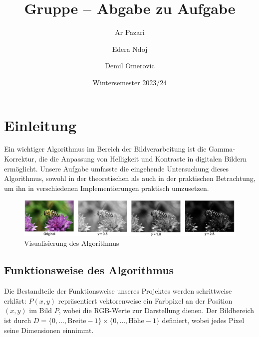 \documentclass[course=erap]{aspdoc}
\author{Ar Pazari \and Edera Ndoj \and Demil Omerovic}
\date{Wintersemester 2023/24} %
\title{Gruppe \theGroup{} -- Abgabe zu Aufgabe \theNumber}
\begin{document}
\maketitle
\section{Einleitung}
Ein wichtiger
Algorithmus im Bereich der Bildverarbeitung ist die Gamma-Korrektur, die die Anpassung von Helligkeit und Kontraste in digitalen Bildern ermöglicht\cite{GammaKorr}. 
Unsere Aufgabe umfasste die eingehende Untersuchung dieses Algorithmus, sowohl in der theoretischen  als auch in der praktischen Betrachtung, um ihn in verschiedenen Implementierungen praktisch umzusetzen. 

\begin{figure}[h]
\centering
\includegraphics[width = 1\textwidth]{images/gamma1.png}
\caption{Visualisierung des Algorithmus}
\label{fig:1}
\end{figure}

\subsection{Funktionsweise des Algorithmus}
Die Bestandteile der Funktionsweise unseres Projektes werden schrittweise erklärt:
$P(x,y)$ repräsentiert vektorenweise ein Farbpixel an der Position $(x,y)$ im Bild $P$, wobei die RGB-Werte zur Darstellung dienen. Der Bildbereich ist durch $D = \{0, \ldots, \text{Breite} - 1\} \times \{0, \ldots, \text{Höhe} - 1\}$ definiert, wobei jedes Pixel seine Dimensionen einnimmt. \par
\end{document}
